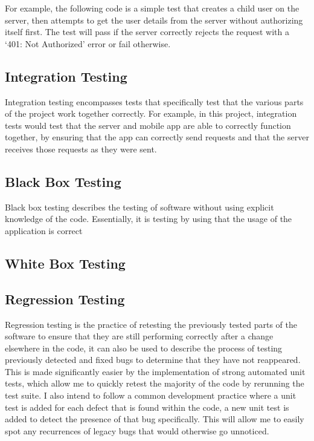 For example, the following code is a simple test that creates a child user on the server, then attempts to get the user details from the server without authorizing itself first. 
The test will pass if the server correctly rejects the request with a `401: Not Authorized' error or fail otherwise.


\subsection{Integration Testing}
Integration testing encompasses tests that specifically test that the various parts of the project work together correctly.
For example, in this project, integration tests would test that the server and mobile app are able to correctly function together, by ensuring that the app can correctly send requests and that the server receives those requests as they were sent.


\subsection{Black Box Testing}
Black box testing describes the testing of software without using explicit knowledge of the code.
Essentially, it is testing by using that the usage of the application is correct

\subsection{White Box Testing}


\subsection{Regression Testing}
Regression testing is the practice of retesting the previously tested parts of the software to ensure that they are still performing correctly after a change elsewhere in the code, it can also be used to describe the process of testing previously detected and fixed bugs to determine that they have not reappeared.
This is made significantly easier by the implementation of strong automated unit tests, which allow me to quickly retest the majority of the code by rerunning the test suite.
I also intend to follow a common development practice where a unit test is added for each defect that is found within the code, a new unit test is added to detect the presence of that bug specifically. 
This will allow me to easily spot any recurrences of legacy bugs that would otherwise go unnoticed.